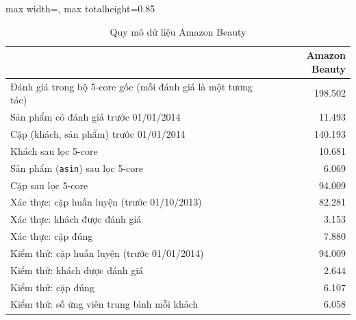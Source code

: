 \begin{table}[H]
    \centering\small
    \caption{Quy mô dữ liệu Amazon Beauty}
    \label{tab:amzdata}
    \begin{adjustbox}{max width=\textwidth, max totalheight=0.85\textheight}
    \begin{tabular}{|l|r|}
        \hline
         & Amazon Beauty \\ \hline
        Đánh giá trong bộ 5-core gốc (mỗi đánh giá là một tương tác) & 198.502 \\ \hline
        Sản phẩm có đánh giá trước 01/01/2014 & 11.493 \\ \hline
        Cặp (khách, sản phẩm) trước 01/01/2014 & 140.193 \\ \hline
        Khách sau lọc 5-core & 10.681 \\ \hline
        Sản phẩm (\texttt{asin}) sau lọc 5-core & 6.069 \\ \hline
        Cặp sau lọc 5-core & 94.009 \\ \hline
        Xác thực: cặp huấn luyện (trước 01/10/2013) & 82.281 \\ \hline
        Xác thực: khách được đánh giá & 3.153 \\ \hline
        Xác thực: cặp đúng & 7.880 \\ \hline
        Kiểm thử: cặp huấn luyện (trước 01/01/2014) & 94.009 \\ \hline
        Kiểm thử: khách được đánh giá & 2.644 \\ \hline
        Kiểm thử: cặp đúng & 6.107 \\ \hline
        Kiểm thử: số ứng viên trung bình mỗi khách & 6.058 \\ \hline
    \end{tabular}
    \end{adjustbox}
\end{table}
